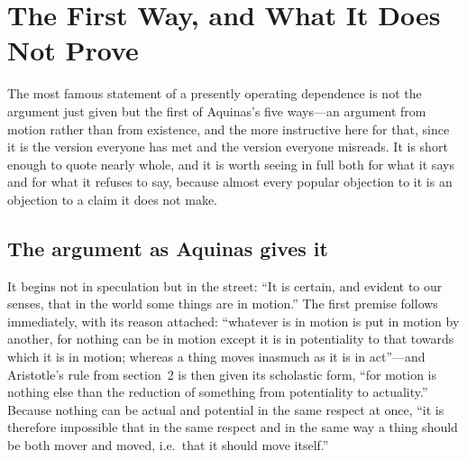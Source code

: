 \section{The First Way, and What It Does Not Prove}

The most famous statement of a presently operating dependence is not the argument just given but the first of Aquinas's five ways---an argument from motion rather than from existence, and the more instructive here for that, since it is the version everyone has met and the version everyone misreads. It is short enough to quote nearly whole, and it is worth seeing in full both for what it says and for what it refuses to say, because almost every popular objection to it is an objection to a claim it does not make.

\subsection{The argument as Aquinas gives it}

It begins not in speculation but in the street: ``It is certain, and evident to our senses, that in the world some things are in motion.'' The first premise follows immediately, with its reason attached: ``whatever is in motion is put in motion by another, for nothing can be in motion except it is in potentiality to that towards which it is in motion; whereas a thing moves inasmuch as it is in act''---and Aristotle's rule from section~2 is then given its scholastic form, ``for motion is nothing else than the reduction of something from potentiality to actuality.'' Because nothing can be actual and potential in the same respect at once, ``it is therefore impossible that in the same respect and in the same way a thing should be both mover and moved, i.e.\ that it should move itself.''

